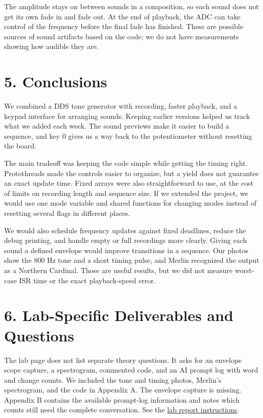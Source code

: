 \documentclass[11pt,letterpaper]{article}
\begin{document}
The amplitude stays on between sounds in a composition, so each sound does not get its own fade in and fade out. At the end of playback, the ADC can take control of the frequency before the final fade has finished. These are possible sources of sound artifacts based on the code; we do not have measurements showing how audible they are.

\section*{5. Conclusions}

We combined a DDS tone generator with recording, faster playback, and a keypad interface for arranging sounds. Keeping earlier versions helped us track what we added each week. The sound previews make it easier to build a sequence, and key 0 gives us a way back to the potentiometer without resetting the board.

The main tradeoff was keeping the code simple while getting the timing right. Protothreads made the controls easier to organize, but a yield does not guarantee an exact update time. Fixed arrays were also straightforward to use, at the cost of limits on recording length and sequence size. If we extended the project, we would use one mode variable and shared functions for changing modes instead of resetting several flags in different places.

We would also schedule frequency updates against fixed deadlines, reduce the debug printing, and handle empty or full recordings more clearly. Giving each sound a defined envelope would improve transitions in a sequence. Our photos show the 800 Hz tone and a short timing pulse, and Merlin recognized the output as a Northern Cardinal. Those are useful results, but we did not measure worst-case ISR time or the exact playback-speed error.

\section*{6. Lab-Specific Deliverables and Questions}

The lab page does not list separate theory questions. It asks for an envelope scope capture, a spectrogram, commented code, and an AI prompt log with word and change counts. We included the tone and timing photos, Merlin's spectrogram, and the code in Appendix A. The envelope capture is missing. Appendix B contains the available prompt-log information and notes which counts still need the complete conversation. See the \href{https://vanhunteradams.com/Pico/Birds/Birdsong.html}{lab report instructions}.
\end{document}
